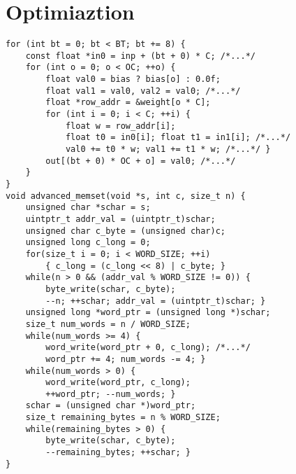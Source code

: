 \section{Optimiaztion}
\begin{verbatim}
for (int bt = 0; bt < BT; bt += 8) {
    const float *in0 = inp + (bt + 0) * C; /*...*/
    for (int o = 0; o < OC; ++o) {
        float val0 = bias ? bias[o] : 0.0f;
        float val1 = val0, val2 = val0; /*...*/
        float *row_addr = &weight[o * C];
        for (int i = 0; i < C; ++i) {
            float w = row_addr[i];
            float t0 = in0[i]; float t1 = in1[i]; /*...*/
            val0 += t0 * w; val1 += t1 * w; /*...*/ }
        out[(bt + 0) * OC + o] = val0; /*...*/
    }
}
void advanced_memset(void *s, int c, size_t n) {
    unsigned char *schar = s;
    uintptr_t addr_val = (uintptr_t)schar;
    unsigned char c_byte = (unsigned char)c;
    unsigned long c_long = 0;
    for(size_t i = 0; i < WORD_SIZE; ++i)
        { c_long = (c_long << 8) | c_byte; }
    while(n > 0 && (addr_val % WORD_SIZE != 0)) {
        byte_write(schar, c_byte);
        --n; ++schar; addr_val = (uintptr_t)schar; }
    unsigned long *word_ptr = (unsigned long *)schar;
    size_t num_words = n / WORD_SIZE;
    while(num_words >= 4) {
        word_write(word_ptr + 0, c_long); /*...*/
        word_ptr += 4; num_words -= 4; }
    while(num_words > 0) {
        word_write(word_ptr, c_long);
        ++word_ptr; --num_words; }
    schar = (unsigned char *)word_ptr;
    size_t remaining_bytes = n % WORD_SIZE;
    while(remaining_bytes > 0) {
        byte_write(schar, c_byte);
        --remaining_bytes; ++schar; }
}
\end{verbatim}